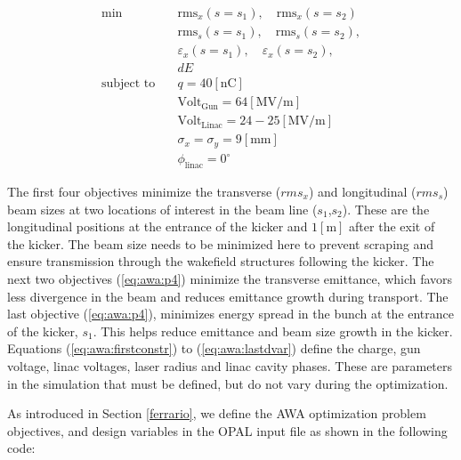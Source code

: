 \begin{align}
\text{min}  \quad & \text{rms}_{x}\left(s = s_1\right), \quad \text{rms}_{x}\left(s = s_2\right) \label{eq:awa:p1}\\
& \text{rms}_{s}\left(s = s_1\right), \quad \text{rms}_{s}\left(s = s_2\right), \label{eq:awa:p2}\\
& \varepsilon_{x}\left(s = s_1\right), \quad \varepsilon_{x}\left(s = s_2\right), \label{eq:awa:p3} \\
& dE \label{eq:awa:p4} \\
\text{subject to} \quad & q = 40 \left[\text{nC}\right] \label{eq:awa:firstconstr}\\
\quad & \text{Volt}_{\text{Gun}} = 64\left[\text{MV/m}\right] \label{eq:awa:lastconstr}\\
\quad & \text{Volt}_{\text{Linac}} = 24-25\left[\text{MV/m}\right] \\
\quad & \sigma_x = \sigma_y = 9 \left[\text{mm}\right] \label{eq:awa:firstdvar}\\
\quad & \phi_{\text{linac}} =0^\circ \label{eq:awa:lastdvar}
\end{align}

The first four objectives minimize the transverse ($rms_x$) and longitudinal ($rms_s$) 
beam sizes at two locations of interest in the beam line ($s_1$,$s_2$). 
These are the longitudinal positions at the entrance of the kicker and 
$1[\text{m}]$ after the exit of the kicker. The beam size needs to be minimized
here to prevent scraping and ensure transmission through the wakefield structures 
following the kicker. The next two objectives (\ref{eq:awa:p4}) minimize the 
transverse emittance, which favors less divergence in the beam and reduces 
emittance growth during transport. The last objective (\ref{eq:awa:p4}), 
minimizes energy spread in the bunch at the entrance of the kicker, $s_1$.  
This helps reduce emittance and beam size growth in the kicker.  
Equations (\ref{eq:awa:firstconstr}) to
(\ref{eq:awa:lastdvar}) define the charge, gun voltage, linac voltages, 
laser radius and linac cavity phases. These are parameters in the simulation 
that must be defined, but do not vary during the optimization.

As introduced in Section \ref{ferrario}, we define the AWA optimization problem 
objectives, and design variables in the OPAL input file as shown in
the following code: %

